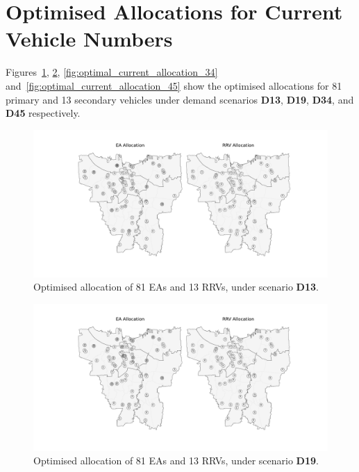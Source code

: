\documentclass[preprint,12pt]{elsarticle}
\begin{document}
\section{Optimised Allocations for Current Vehicle Numbers}
Figures~\ref{fig:optimal_current_allocation_13},
\ref{fig:optimal_current_allocation_19}, \ref{fig:optimal_current_allocation_34}
and~\ref{fig:optimal_current_allocation_45} show the optimised allocations for
81 primary and 13 secondary vehicles under demand scenarios \textbf{D13},
\textbf{D19}, \textbf{D34}, and \textbf{D45} respectively.

\begin{figure}
\begin{center}
\includegraphics[width=\textwidth]{img/map_optimised_13}
\caption{Optimised allocation of 81 EAs and 13 RRVs, under scenario \textbf{D13}.}
\label{fig:optimal_current_allocation_13}
\end{center}
\end{figure}

\begin{figure}
\begin{center}
\includegraphics[width=\textwidth]{img/map_optimised_19}
\caption{Optimised allocation of 81 EAs and 13 RRVs, under scenario \textbf{D19}.}
\label{fig:optimal_current_allocation_19}
\end{center}
\end{figure}
\end{document}
